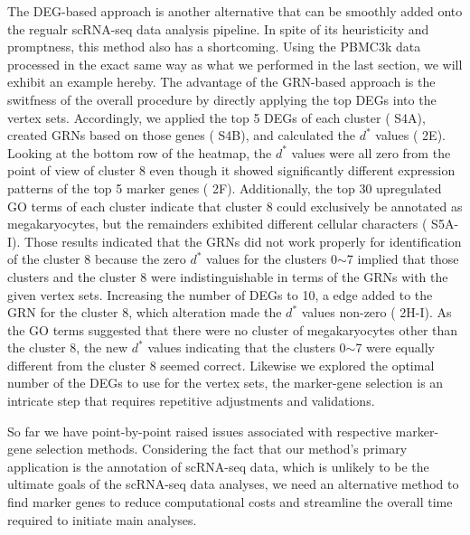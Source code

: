 \documentclass{article}
\begin{document}
The DEG-based approach is another alternative that can be smoothly added onto the regualr scRNA-seq data 
analysis pipeline. In spite of its heuristicity and promptness, this method also has a shortcoming. Using the 
PBMC3k data processed in the exact same way as what we performed in the last section, we will exhibit an 
example hereby. The advantage of the GRN-based approach is the switfness of the overall procedure by directly 
applying the top DEGs into the vertex sets. Accordingly, we applied the top 5 DEGs of each cluster (\figurename{ S4A}), 
created GRNs based on those genes (\figurename{ S4B}), and calculated the $d^*$ values (\figurename{ 2E}). Looking at the bottom 
row of the heatmap, the $d^*$ values were all zero from the point of view of cluster 8 even though it 
showed significantly different expression patterns of the top 5 marker genes (\figurename{ 2F}). Additionally, the top 30 
upregulated GO terms of each cluster indicate that cluster 8 could exclusively be annotated as megakaryocytes, but 
the remainders exhibited different cellular characters (\figurename{ S5A-I}). Those results indicated that the GRNs did 
not work properly for identification of the cluster 8 because the zero $d^*$ values for the clusters 0$\sim$7 implied that those 
clusters and the cluster 8 were indistinguishable in terms of the GRNs with the given vertex sets. Increasing 
the number of DEGs to 10, a edge added to the GRN for the cluster 8, which alteration made the $d^*$ values non-zero 
(\figurename{ 2H-I}). As the GO terms suggested that there were no cluster of megakaryocytes other than the cluster 8, 
the new $d^*$ values indicating that the clusters 0$\sim$7 were equally different from the cluster 8 seemed correct. Likewise 
we explored the optimal number of the DEGs to use for the vertex sets, the marker-gene selection is an intricate 
step that requires repetitive adjustments and validations. 

So far we have point-by-point raised issues associated with respective marker-gene selection methods.
Considering the fact that our method's primary application is the annotation of scRNA-seq data, which is unlikely to be 
the ultimate goals of the scRNA-seq data analyses, we need an alternative method to find marker genes to reduce 
computational costs and streamline the overall time required to initiate main analyses.
\end{document}
